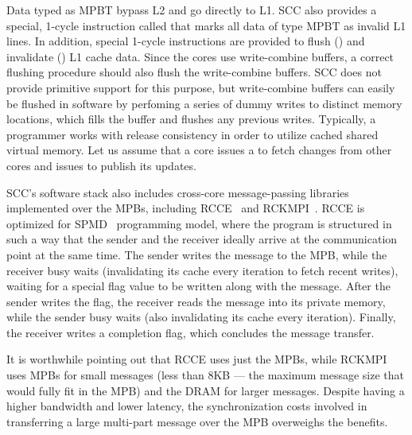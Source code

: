 Data typed as MPBT bypass L2 and go directly to L1. SCC also provides a
special, 1-cycle instruction called  that marks all data of type
MPBT as invalid L1 lines. In addition, special 1-cycle instructions are
provided to flush () and invalidate () L1 cache data.
Since the cores use write-combine buffers, a correct flushing procedure should
also flush the write-combine buffers. SCC does not provide primitive support
for this purpose, but write-combine buffers can easily be flushed in software
by perfoming a series of dummy writes to distinct memory locations, which fills
the buffer and flushes any previous writes. Typically, a programmer works with
release consistency in order to utilize cached shared virtual memory. Let us
assume that a core issues a  to fetch changes from other cores
and issues  to publish its updates.

SCC's software stack also includes cross-core message-passing libraries
implemented over the MPBs, including RCCE~\cite{Mattson2010} and
RCKMPI~\cite{Urena2011}. RCCE is optimized for SPMD~\cite{} programming model,
where the program is structured in such a way that the sender and the receiver
ideally arrive at the communication point at the same time. The sender writes
the message to the MPB, while the receiver busy waits (invalidating its cache
every iteration to fetch recent writes), waiting for a special flag value to be
written along with the message. After the sender writes the flag, the receiver
reads the message into its private memory, while the sender busy waits (also
invalidating its cache every iteration). Finally, the receiver writes a
completion flag, which concludes the message transfer.

It is worthwhile pointing out that RCCE uses just the MPBs, while RCKMPI uses
MPBs for small messages (less than 8KB --- the maximum message size that would
fully fit in the MPB) and the DRAM for larger messages. Despite having a higher
bandwidth and lower latency, the synchronization costs involved in transferring
a large multi-part message over the MPB overweighs the benefits.
